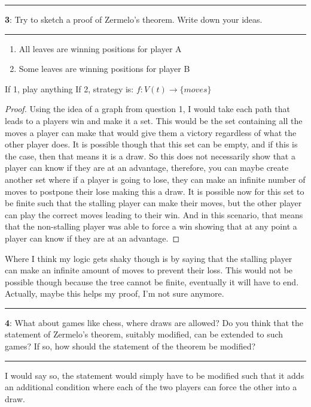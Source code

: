 \documentclass[11pt]{article}
\newcommand\question[2]{\vspace{.25in}\hrule\textbf{#1}: #2\vspace{.5em}\hrule\vspace{.10in}}
\begin{document}
\question{3}{Try to sketch a proof of Zermelo's theorem. Write down your ideas.}

\begin{enumerate}
	\item All leaves are winning positions for player A
	\item Some leaves are winning positions for player B
\end{enumerate}

If 1, play anything
If 2, strategy is: $f:V(t) \rightarrow \{moves\}$


\begin{proof}
	Using the idea of a graph from question 1, I would take each path that leads to a players win and make it a set. This would be the set containing all the moves a player can make that would give them a victory regardless of what the other player does. It is possible though that this set can be empty, and if this is the case, then that means it is a draw. So this does not necessarily show that a player can know if they are at an advantage, therefore, you can maybe create another set where if a player is going to lose, they can make an infinite number of moves to postpone their lose making this a draw. It is possible now for this set to be finite such that the stalling player can make their moves, but the other player can play the correct moves leading to their win. And in this scenario, that means that the non-stalling player was able to force a win showing that at any point a player can know if they are at an advantage.
\end{proof}
Where I think my logic gets shaky though is by saying that the stalling player can make an infinite amount of moves to prevent their loss. This would not be possible though because the tree cannot be finite, eventually it will have to end. Actually, maybe this helps my proof, I'm not sure anymore.

\question{4}{What about games like chess, where draws are allowed? Do you think that the statement of Zermelo's theorem, suitably modified, can be extended to such games? If so, how should the statement of the theorem be modified?}

I would say so, the statement would simply have to be modified such that it adds an additional condition where each of the two players can force the other into a draw. 





	
\end{document}
